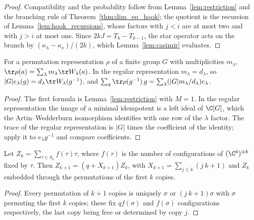 \begin{proof}\leanok
    Compatibility and the probability follow from Lemma~\ref{lem:restriction} and the
    branching rule of Theorem~\ref{thm:dim_eq_hook}; the quotient is the recursion of
    Lemma~\ref{lem:hook_recursions}, whose factors with $j<i$ are at most two and with
    $j>i$ at most one. Since $2kJ=T_k-T_{k-1}$, the star operator acts on the branch
    by $(\kappa_\lambda-\kappa_\nu)/(2k)$, which Lemma~\ref{lem:casimir} evaluates.
\end{proof}

\begin{lemma}
    \label{lem:character_projection}
    \leanok
    For a permutation representation $\rho$ of a finite group $G$ with multiplicities
    $m_\lambda$, $\tr\rho(a)=\sum_\lambda m_\lambda\tr W_\lambda(a)$. In the regular
    representation $m_\lambda=d_\lambda$, so $|G|e_\lambda(g)=d_\lambda\tr
    W_\lambda(g^{-1})$, and
    $\sum_g\tr\rho(g^{-1})\,g=\sum_\lambda(|G|m_\lambda/d_\lambda)e_\lambda$.
\end{lemma}

\begin{proof}\leanok
    The first formula is Lemma~\ref{lem:restriction} with $M=1$. In the regular
    representation the image of a minimal idempotent is a left ideal of
    $\C[G]$, which the Artin--Wedderburn isomorphism identifies with one row of the
    $\lambda$ factor. The trace of the regular representation is $|G|$ times the
    coefficient of the identity; apply it to $e_\lambda g^{-1}$ and compare
    coefficients.
\end{proof}

\begin{lemma}
    \label{lem:jucys}
    \leanok
    Let $Z_k=\sum_{\tau\in S_k}f(\tau)\tau$, where $f(\tau)$ is the number of
    configurations of $(\C^q)^{\otimes k}$ fixed by $\tau$. Then
    $Z_{k+1}=(q+X_{k+1})Z_k$, with $X_{k+1}=\sum_{j\le k}(j\ k{+}1)$ and $Z_k$
    embedded through the permutations of the first $k$ copies.
\end{lemma}

\begin{proof}\leanok
    Every permutation of $k+1$ copies is uniquely $\sigma$ or $(j\ k{+}1)\sigma$ with
    $\sigma$ permuting the first $k$ copies; these fix $qf(\sigma)$ and $f(\sigma)$
    configurations respectively, the last copy being free or determined by copy $j$.
\end{proof}

